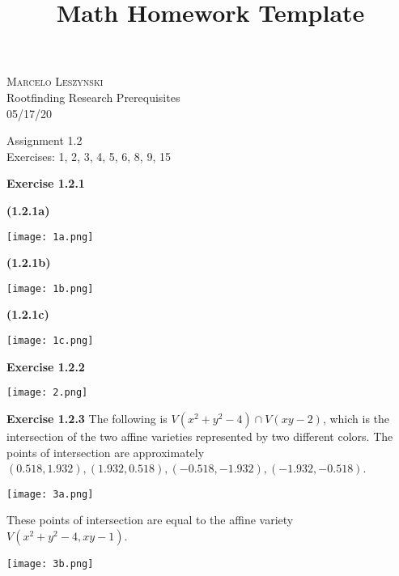 \documentclass[12pt,oneside]{article}
\newenvironment{exercise}[1]{\vspace{.1in}\noindent\textbf{Exercise #1 \hspace{.05em}}}{}
\begin{document}
\title{Math Homework Template}

\begin{flushright}
\textsc{Marcelo Leszynski}  \\
Rootfinding Research Prerequisites\\
05/17/20
\end{flushright}

\begin{center}
\textsf{Assignment 1.2 } \\
\textsf{Exercises: 1, 2, 3, 4, 5, 6, 8, 9, 15 }
\end{center}


\begin{exercise}{1.2.1}

\bigskip
\textbf{(1.2.1a)}

\texttt{[image: 1a.png]}

\bigskip
\textbf{(1.2.1b)}

\texttt{[image: 1b.png]}

\bigskip
\textbf{(1.2.1c)}

\texttt{[image: 1c.png]}

\end{exercise}

\newpage
\begin{exercise}{1.2.2}

\texttt{[image: 2.png]}
\end{exercise}


\begin{exercise}{1.2.3}
    The following is $V(x^2+y^2-4)\cap V(xy-2)$, which is the 
    intersection of the two affine varieties represented by 
    two different colors. The points of intersection are 
    approximately $(0.518,1.932),(1.932,0.518),(-0.518,-1.932),
    (-1.932,-0.518)$.

    \texttt{[image: 3a.png]}

    These points of intersection are equal to the affine variety 
    $V(x^2+y^2-4,xy-1)$.

    \texttt{[image: 3b.png]}
\end{exercise}
\end{document}
